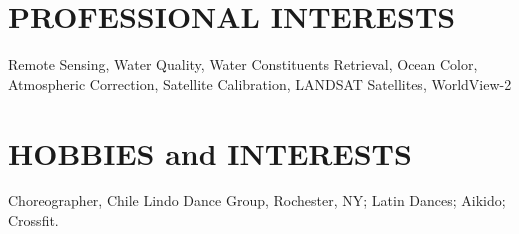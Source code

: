 \documentclass[11pt]{res} %
\begin{document}
\begin{resume}
\vspace{-0.1in}
\section{PROFESSIONAL INTERESTS}
\vspace{0.1in}
Remote Sensing, Water Quality, Water Constituents Retrieval, Ocean Color, Atmospheric Correction, Satellite Calibration, LANDSAT Satellites, WorldView-2\\

\vspace{-0.1in}
\section{HOBBIES and INTERESTS}
\vspace{0.1in}
Choreographer, Chile Lindo Dance Group, Rochester, NY; Latin Dances; Aikido; Crossfit. \\

\end{resume}
\end{document}
